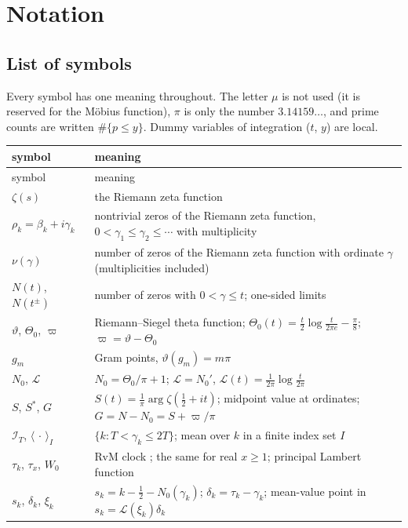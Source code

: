 \documentclass[preprint,12pt]{elsarticle}
\makeatletter
\let\CG@origeqref\eqref
\newcommand{\CG@gettip}[1]{\@ifundefined{CGTip@#1}{Reference: #1}{\csname CGTip@#1\endcsname}}
\DeclareRobustCommand{\CGeqref}[1]{\pdftooltip{\CG@origeqref{#1}}{\CG@gettip{#1}}}
\numberwithin{equation}{section}
\theoremstyle{plain}
\theoremstyle{definition}
\theoremstyle{remark}
\newcommand{\NO}{N_0}
\newcommand{\lL}{\mathcal L}
\newcommand{\IT}{\mathcal I_T}
\makeatother
\begin{document}
\section{Notation}
\label{sec:notation}

\subsection{List of symbols}
\label{subsec:symbols}
Every symbol has one meaning throughout. The letter $\mu$ is not used (it is reserved for the M\"obius function), $\pi$ is only the number $3.14159\ldots$, and prime counts are written $\#\{p\le y\}$. Dummy variables of integration ($t$, $y$) are local.

\begin{center}
\small
\begin{longtable}{p{}p{}}
\toprule
symbol & meaning\\
\midrule
\endfirsthead
\toprule
symbol & meaning\\
\midrule
\endhead
\bottomrule
\endfoot
$\zeta(s)$ & the Riemann zeta function\\
$\rho_k=\beta_k+i\gamma_k$ & nontrivial zeros of the Riemann zeta function, $0<\gamma_1\le\gamma_2\le\cdots$ with multiplicity\\
$\nu(\gamma)$ & number of zeros of the Riemann zeta function with ordinate $\gamma$ (multiplicities included)\\
$N(t)$, $N(t^\pm)$ & number of zeros with $0<\gamma\le t$; one-sided limits\\
$\vartheta$, $\Theta_0$, $\varpi$ & Riemann--Siegel theta function; $\Theta_0(t)=\frac t2\log\frac t{2\pi e}-\frac\pi8$; $\varpi=\vartheta-\Theta_0$\\
$g_m$ & Gram points, $\vartheta(g_m)=m\pi$\\
$\NO$, $\lL$ & $\NO=\Theta_0/\pi+1$; $\lL=\NO'$, $\lL(t)=\frac1{2\pi}\log\frac t{2\pi}$\\
$S$, $S^*$, $G$ & $S(t)=\frac1\pi\arg\zeta(\frac12+it)$; midpoint value at ordinates; $G=N-\NO=S+\varpi/\pi$\\
$\IT$, $\langle\,\cdot\,\rangle_I$ & $\{k:T<\gamma_k\le2T\}$; mean over $k$ in a finite index set $I$\\
$\tau_k$, $\tau_x$, $W_0$ & RvM clock \CGeqref{eq:clock}; the same for real $x\ge1$; principal Lambert function\\
$s_k$, $\delta_k$, $\xi_k$ & $s_k=k-\frac12-\NO(\gamma_k)$; $\delta_k=\tau_k-\gamma_k$; mean-value point in $s_k=\lL(\xi_k)\delta_k$\\

\end{longtable}
\end{center}
\end{document}
